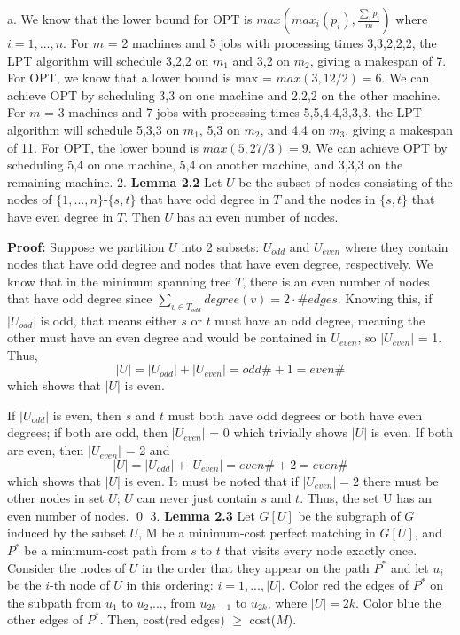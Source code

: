 \documentclass[oneside]{homework} %
\begin{document}
{\large a.} We know that the lower bound for OPT is $max(max_i(p_i), \frac{\sum\limits_{i}p_i}{m})$ where $i = 1,...,n$. 
\newline
\newline
For $m$ = 2 machines and 5 jobs with processing times 3,3,2,2,2, the LPT algorithm will schedule 3,2,2 on $m_1$ and 3,2 on $m_2$, giving a makespan of 7. For OPT, we know that a lower bound is max = $max(3, 12/2) = 6$. We can achieve OPT by scheduling 3,3 on one machine and 2,2,2 on the other machine.
\newline
\newline
For $m$ = 3 machines and 7 jobs with processing times 5,5,4,4,3,3,3, the LPT algorithm will schedule 5,3,3 on $m_1$, 5,3 on $m_2$, and 4,4 on $m_3$, giving a makespan of 11. For OPT, the lower bound is $max(5, 27/3) = 9$. We can achieve OPT by scheduling 5,4 on one machine, 5,4 on another machine, and 3,3,3 on the remaining machine.
\newline
\newline
{\large2.} \textbf{Lemma 2.2} Let $U$ be the subset of nodes consisting of the nodes of $\{1,...,n\}$-$\{s,t\}$ that have odd degree in $T$ and the nodes in $\{s,t\}$ that have even degree in $T$. Then $U$ has an even number of nodes.
\newline

\textbf{Proof:} Suppose we partition $U$ into 2 subsets: $U_{odd}$ and $U_{even}$ where they contain nodes that have odd degree and nodes that have even degree, respectively. We know that in the minimum spanning tree $T$, there is an even number of nodes that have odd degree since $\sum\limits_{v\in T_{odd}}degree(v) = 2\cdot \# edges$. Knowing this, if $|U_{odd}|$ is odd, that means either $s$ or $t$ must have an odd degree, meaning the other must have an even degree and would be contained in $U_{even}$, so $|U_{even}|$ = 1.  Thus, $$|U| = |U_{odd}|+| U_{even}| = odd\# + 1 = even\# $$ which shows that $|U|$ is even. 

If $|U_{odd}|$ is even, then $s$ and $t$ must both have odd degrees or both have even degrees; if both are odd, then $|U_{even}|$ = 0 which trivially shows $|U|$ is even. If both are even, then $|U_{even}|$ = 2 and $$|U| = |U_{odd}|+| U_{even}| = even\# + 2 = even\# $$ which shows that $|U|$ is even. It must be noted that if $|U_{even}| = 2$ there must be other nodes in set $U$; $U$ can never just contain $s$ and $t$. Thus, the set U has an even number of nodes. \hfill\qed
\newline
\newline
{\large3.} \textbf{Lemma 2.3} Let $G[U]$ be the subgraph of $G$ induced by the subset $U$, M be a minimum-cost perfect matching in $G[U]$, and $P^*$ be a minimum-cost path from $s$ to $t$ that visits every node exactly once. Consider the nodes of $U$ in the order that they appear on the path $P^*$ and let $u_i$ be the $i$-th node of $U$ in this ordering: $ i=1,...,|U|$. Color red the edges of $P^*$ on the subpath from $u_1$ to $u_2$,..., from $u_{2k-1}$ to $u_{2k}$, where $|U|=2k$. Color blue the other edges of $P^*$. Then, cost(red edges) $\geq$ cost($M$).
\newline
\end{document}
